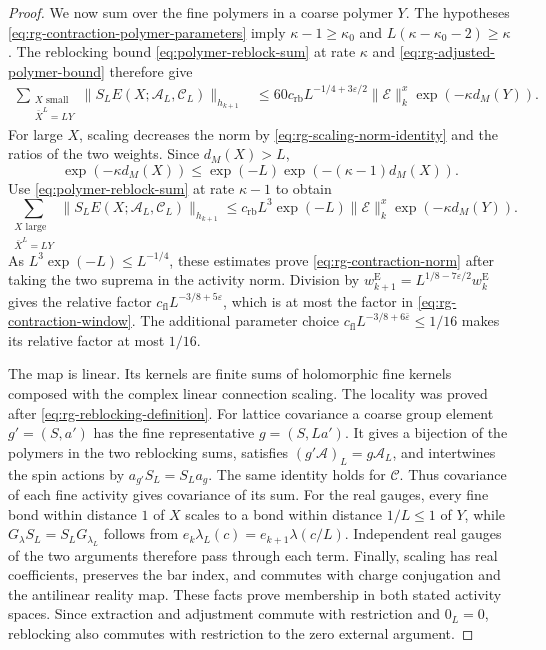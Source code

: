 \begin{proof}
We now sum over the fine polymers in a coarse polymer
$Y$. The hypotheses \eqref{eq:rg-contraction-polymer-parameters}
imply
$\kappa-1\ge\kappa_0$ and
$L(\kappa-\kappa_0-2)\ge\kappa$.
The reblocking bound
\eqref{eq:polymer-reblock-sum} at rate $\kappa$
and \eqref{eq:rg-adjusted-polymer-bound} therefore give
\[
 \begin{split}
 \sum_{\substack{X\text{ small}\\\bar X^L=LY}}
       \|S_LE(X;\mathscr A_L,\mathscr C_L)\|_{h_{k+1}}
 &\le60c_{\mathrm{rb}}L^{-1/4+3\varepsilon/2}
       \|\mathscr E\|_k^x\exp(-\kappa d_M(Y)).
 \end{split}
\]
For large $X$, scaling decreases the norm by
\eqref{eq:rg-scaling-norm-identity} and the ratios of
the two weights. Since $d_M(X)>L$,
\[
 \exp(-\kappa d_M(X))
       \le\exp(-L)\exp(-(\kappa-1)d_M(X)).
\]
Use \eqref{eq:polymer-reblock-sum} at rate $\kappa-1$
to obtain
\[
 \sum_{\substack{X\text{ large}\\\bar X^L=LY}}
       \|S_LE(X;\mathscr A_L,\mathscr C_L)\|_{h_{k+1}}
 \le c_{\mathrm{rb}}L^3\exp(-L)
             \|\mathscr E\|_k^x\exp(-\kappa d_M(Y)).
\]
As $L^3\exp(-L)\le L^{-1/4}$, these estimates prove
\eqref{eq:rg-contraction-norm} after taking the two
suprema in the activity norm. Division by
$w_{k+1}^{\mathrm E}=L^{1/8-7\varepsilon/2}w_k^{\mathrm E}$
gives the relative factor $c_{\mathrm{fl}}L^{-3/8+5\varepsilon}$,
which is at most the factor in \eqref{eq:rg-contraction-window}.
The additional parameter choice
$c_{\mathrm{fl}}L^{-3/8+6\bar\varepsilon}\le1/16$
makes its relative factor at most $1/16$.

The map is linear. Its kernels are finite sums of
holomorphic fine kernels composed with the complex
linear connection scaling. The locality was proved
after \eqref{eq:rg-reblocking-definition}.
For lattice covariance a coarse group element
$g'=(S,a')$ has the fine representative $g=(S,La')$.
It gives a bijection of the polymers in the two
reblocking sums, satisfies
$(g'\mathscr A)_L=g\mathscr A_L$, and intertwines the
spin actions by $a_{g'}S_L=S_La_g$.
The same identity holds for $\mathscr C$.
Thus covariance of each fine activity gives covariance
of its sum. For the real gauges, every fine bond within
distance $1$ of $X$ scales to a bond within distance
$1/L\le1$ of $Y$, while
$G_\lambda S_L=S_LG_{\lambda_L}$ follows from
$e_k\lambda_L(c)=e_{k+1}\lambda(c/L)$.
Independent real gauges of the two arguments therefore
pass through each term. Finally, scaling has real
coefficients, preserves the bar index, and commutes with
charge conjugation and the antilinear reality map.
These facts prove membership in both stated activity
spaces. Since extraction and adjustment commute with
restriction and $0_L=0$, reblocking also commutes with
restriction to the zero external argument.
\end{proof}

